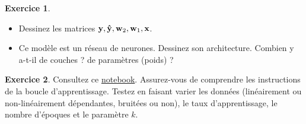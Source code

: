 \documentclass[a4paper,francais]{article}
\theoremstyle{definition}
\newtheorem{exercice}{Exercice}[section]
\begin{document}
\begin{exercice}
  ~
  
  \begin{itemize}
  \item Dessinez les matrices $\mathbf{y},\mathbf{\hat{y}},\mathbf{w}_2, \mathbf{w}_1, \mathbf{x}$. 
  \item Ce modèle est un réseau de neurones. Dessinez son architecture.
    Combien y a-t-il de couches ? de paramètres (poids) ?
  \end{itemize}
\end{exercice}

\begin{exercice}
  Consultez ce \href{https://colab.research.google.com/drive/1K9mvvRNvWj3MbHmxZZOnIpW1CmZtrt0A?usp=sharing}{notebook}.
  Assurez-vous de comprendre les instructions de la boucle d'apprentissage. Testez en faisant
  varier les données (linéairement ou non-linéairement dépendantes, bruitées ou non),
  le taux d'apprentissage, le nombre d'époques et le paramètre $k$.  
\end{exercice}
\end{document}
